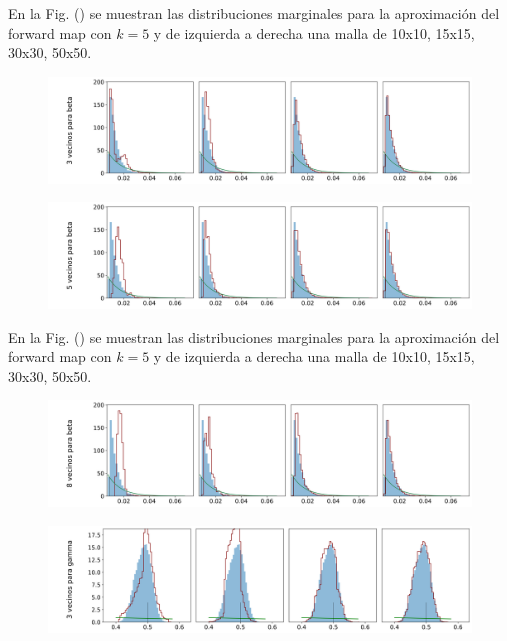 En la Fig. () se muestran las distribuciones marginales para la aproximación del forward map con $k = 5$ y de izquierda a derecha una malla de 10x10, 15x15, 30x30, 50x50.


\begin{figure}[H] 
    \centering 
    \includegraphics[width = 17 cm ]{img/Exp_Central_SIR_Sigma/Figuras/Generales/Convergencia_theta1_1_SIR_sigma.png} 
\end{figure} 

\begin{figure}[H] 
    \centering 
    \includegraphics[width = 17 cm ]{img/Exp_Central_SIR_Sigma/Figuras/Generales/Convergencia_theta1_2_SIR_sigma.png} 
\end{figure} 

En la Fig. () se muestran las distribuciones marginales para la aproximación del forward map con $k = 5$ y de izquierda a derecha una malla de 10x10, 15x15, 30x30, 50x50.

\begin{figure}[H] 
    \centering 
    \includegraphics[width = 17 cm ]{img/Exp_Central_SIR_Sigma/Figuras/Generales/Convergencia_theta1_3_SIR_sigma.png} 
\end{figure} 

\begin{figure}[H] 
    \centering 
    \includegraphics[width = 17 cm ]{img/Exp_Central_SIR_Sigma/Figuras/Generales/Convergencia_theta2_1_SIR_sigma.png} 
\end{figure} 

